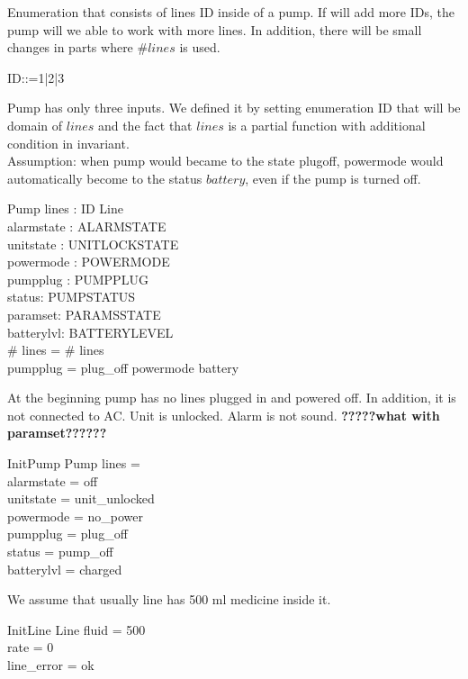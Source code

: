 \documentclass{article}
\begin{document}
	Enumeration that consists of lines ID inside of a pump. If will add more IDs, the pump will we able to work with more lines. In addition, there will be small changes in parts where $\# lines$ is used.
	\begin{zed}
		ID::=1|2|3
	\end{zed}
	
	Pump has only three inputs. We defined it by setting enumeration ID that will be domain of $lines$ and the fact that $lines$ is a partial function with additional condition in invariant.\\
		Assumption: when pump would became to the state plugoff, powermode would automatically become to the status $battery$, even if the pump is turned off. 
	

	\begin{schema}{Pump}
		lines : ID \pfun Line \\
		alarmstate : ALARMSTATE \\
		unitstate : UNITLOCKSTATE \\
		powermode : POWERMODE \\
		pumpplug : PUMPPLUG \\
		status: PUMPSTATUS \\
		paramset: PARAMSSTATE \\
		batterylvl: BATTERYLEVEL\\
		
	\where
		\# \ran lines = \# \dom lines \\
		pumpplug = plug\_off \implies powermode \neq battery 
	\end{schema}
	
	
	At the beginning pump has no lines plugged in and powered off. In addition, it is not connected to AC. Unit is unlocked. Alarm is not sound. 
	\textbf{?????what with paramset??????}
		
	
	\begin{schema}{InitPump}
		Pump
		\where
		lines = \emptyset \\
		alarmstate = off \\
		unitstate  = unit\_unlocked \\
		powermode =  no\_power \\
		pumpplug = plug\_off \\
		status = pump\_off \\	
		batterylvl = charged\\
	\end{schema}
	
	We assume that usually line has 500 ml medicine inside it.
	\begin{schema}{InitLine}
		Line
		\where
		fluid = 500 \\
		rate = 0 \\
		line\_error = ok \\
	\end{schema}
\end{document}
